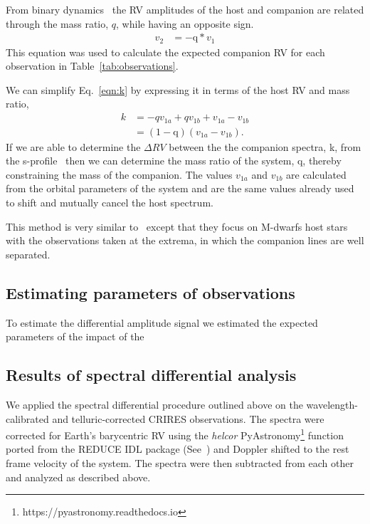 \documentclass[fleqn,usenatbib]{mnras}
\begin{document}
    From binary dynamics~\citep[e.g.][]{murray_keplerian_2010} the RV amplitudes of the host and companion are related through the mass ratio, \(q \), while having an opposite sign.
    \begin{align}
    v_{2}  &= -\textrm{q} * v_{1} \label{eqn:q_relation}
    \end{align}
    This equation was used to calculate the expected companion RV for each observation in Table~\ref{tab:observations}. 
    
    We can simplify Eq.~\ref{eqn:k} by expressing it in terms of the host RV and mass ratio,
    \begin{align}
    k &= -q v_{1a} + q v_{1b} + v_{1a} - v_{1b} \nonumber \\
    &= (1 - \textrm{q})(v_{1a} - v_{1b}). \label{eqn:k_simplified}
    \end{align}
    If we are able to determine the \(\Delta RV \) between the the companion spectra, k, from the s-profile~\citep[see ][]{ferluga_separating_1997} then we can determine the mass ratio of the system, q, thereby constraining the mass of the companion. The values \(v_{1a} \) and \(v_{1b} \) are calculated from the orbital parameters of the system and are the same values already used to shift and mutually cancel the host spectrum.
    
    This method is very similar to~\citet{kostogryz_spectral_2013} except that they focus on M-dwarfs host stars with the observations taken at the extrema, in which the companion lines are well separated.
    
    \subsection{Estimating parameters of observations}
    To estimate the  differential amplitude signal we estimated the expected parameters of the impact of the 
    
    \subsection{Results of spectral differential analysis}
    
    \label{appendix:A2}
    We applied the spectral differential procedure outlined above on the wavelength-calibrated and telluric-corrected CRIRES observations. The spectra were corrected for Earth's barycentric RV using the \emph{helcor} PyAstronomy\footnote{https://pyastronomy.readthedocs.io} function ported from the REDUCE IDL package (See~\citet[][]{piskunov_new_2002}) and Doppler shifted to the rest frame velocity of the system. The spectra were then subtracted from each other and analyzed as described above.
    
\end{document}
